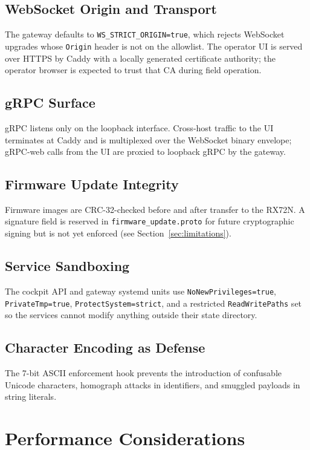 \documentclass[11pt,letterpaper]{article}
\begin{document}
\subsection{WebSocket Origin and Transport}
The gateway defaults to \texttt{WS\_STRICT\_ORIGIN=true}, which
rejects WebSocket upgrades whose \texttt{Origin} header is not on
the allowlist. The operator UI is served over HTTPS by Caddy with a
locally generated certificate authority; the operator browser is
expected to trust that CA during field operation.

\subsection{gRPC Surface}
gRPC listens only on the loopback interface. Cross-host traffic to
the UI terminates at Caddy and is multiplexed over the WebSocket
binary envelope; gRPC-web calls from the UI are proxied to loopback
gRPC by the gateway.

\subsection{Firmware Update Integrity}
Firmware images are CRC-32-checked before and after transfer to the
RX72N. A signature field is reserved in \texttt{firmware\_update.proto}
for future cryptographic signing but is not yet enforced (see
Section~\ref{sec:limitations}).

\subsection{Service Sandboxing}
The cockpit API and gateway systemd units use
\texttt{NoNewPrivileges=true}, \texttt{PrivateTmp=true},
\texttt{ProtectSystem=strict}, and a restricted \texttt{ReadWritePaths}
set so the services cannot modify anything outside their state
directory.

\subsection{Character Encoding as Defense}
The 7-bit ASCII enforcement hook prevents the introduction of
confusable Unicode characters, homograph attacks in identifiers, and
smuggled payloads in string literals.

\section{Performance Considerations}
\label{sec:performance}
\end{document}
